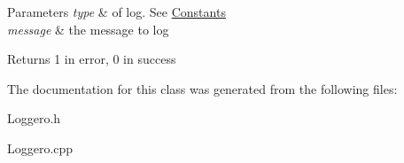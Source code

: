 \begin{DoxyParams}{Parameters}
{\em type} & of log. See \hyperlink{classConstants}{Constants} \\
\hline
{\em message} & the message to log \\
\hline
\end{DoxyParams}
\begin{DoxyReturn}{Returns}
1 in error, 0 in success 
\end{DoxyReturn}


The documentation for this class was generated from the following files\-:\begin{DoxyCompactItemize}
\item 
Loggero.\-h\item 
Loggero.\-cpp\end{DoxyCompactItemize}
